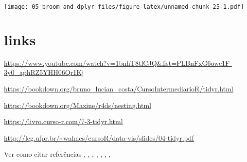 \documentclass[
]{book}
\begin{document}
\texttt{[image: 05\_broom\_and\_dplyr\_files/figure-latex/unnamed-chunk-25-1.pdf]}

\hypertarget{links}{%
\section{links}\label{links}}

\url{https://www.youtube.com/watch?v=1bnhT8tlCJQ\&list=PLBnFxG6owe1F-3y0_aphRZ5YHH06Qr1Kj}

\url{https://bookdown.org/bruno_lucian_costa/CursoIntermediarioR/tidyr.html}

\url{https://bookdown.org/Maxine/r4ds/nesting.html}

\url{https://livro.curso-r.com/7-3-tidyr.html}

\url{http://leg.ufpr.br/~walmes/cursoR/data-vis/slides/04-tidyr.pdf}

Ver como citar referências \citet{tidyverse2019}, \citet{R-tidyverse}, \citet{R-tidyr}, \citet{R-ggplot2}, \citet{R-purrr}, \citet{R-dplyr}, \citet{R-knitr}, \citet{R-bookdown}

  
\end{document}
